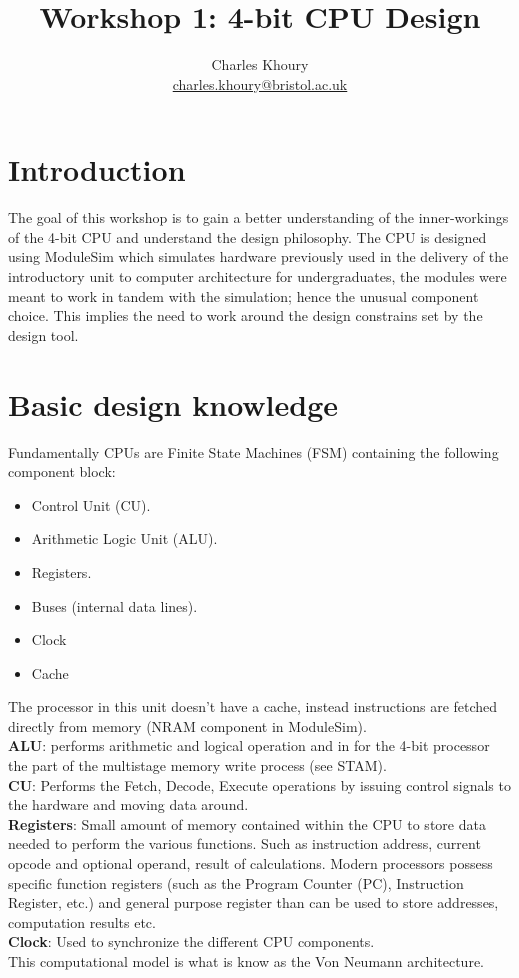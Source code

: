 \documentclass[a4paper, 11pt]{article}
\title{Workshop 1: 4-bit CPU Design}
\author{Charles Khoury \\
\href{mailto:ck15960@my.bristol.ac.uk}{charles.khoury@bristol.ac.uk}}
\begin{document}
\maketitle

\section{Introduction}

The goal of this workshop is to gain a better understanding of the inner-workings of the 4-bit CPU and understand the design philosophy. The CPU is designed using ModuleSim which simulates hardware previously used in the delivery of the introductory unit to computer architecture for undergraduates, the modules were meant to work in tandem with the simulation; hence the unusual component choice. This implies the need to work around the design constrains set by the design tool.

\section{Basic design knowledge}
Fundamentally CPUs are Finite State Machines (FSM) containing the following component block:
\begin{itemize}
  \item Control Unit (CU).
  \item Arithmetic Logic Unit (ALU).
  \item Registers.
  \item Buses (internal data lines).
  \item Clock
  \item Cache
\end{itemize}
The processor in this unit doesn't have a cache, instead instructions are fetched directly from memory (NRAM component in ModuleSim).\\
\textbf{ALU}: performs arithmetic and logical operation and in for the 4-bit processor the part of the multistage memory write process (see STAM). \\
\textbf{CU}: Performs the Fetch, Decode, Execute operations by issuing control  signals to the hardware and moving data around.\\
\textbf{Registers}: Small amount of memory contained within the CPU to store data needed to perform the various functions. Such as instruction address, current opcode and optional operand, result of calculations. Modern processors possess specific function registers (such as the Program Counter (PC), Instruction Register, etc.) and general purpose register than can be used to store addresses, computation results etc. \\
\textbf{Clock}: Used to synchronize the different CPU components. \\
This computational model is what is know as the Von Neumann architecture. 
\end{document}

